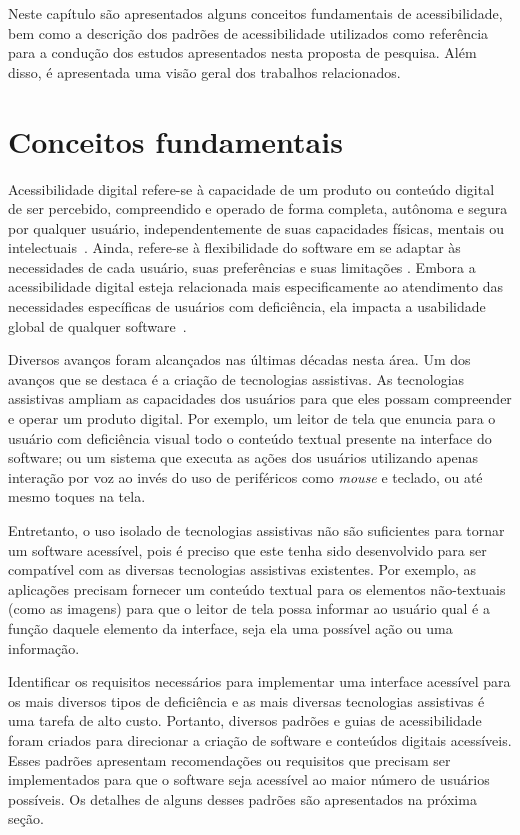 
Neste capítulo são apresentados alguns conceitos fundamentais de acessibilidade, bem como a descrição dos padrões de acessibilidade utilizados como referência para a condução dos estudos apresentados nesta proposta de pesquisa. Além disso, é apresentada uma visão geral dos trabalhos relacionados.

\section{Conceitos fundamentais}

Acessibilidade digital refere-se à capacidade de um produto ou conteúdo digital de ser percebido, compreendido e operado de forma completa, autônoma e segura por qualquer usuário, independentemente de suas capacidades físicas, mentais ou intelectuais~\cite{w3cwai}. Ainda, refere-se à flexibilidade do software em se adaptar às necessidades de cada usuário, suas preferências e suas limitações \cite{camilamaster}. 
Embora a acessibilidade digital esteja relacionada mais especificamente ao atendimento das necessidades específicas de usuários com deficiência, 
ela impacta a usabilidade global de qualquer software~\cite{ref}.

Diversos avanços foram alcançados nas últimas décadas nesta área. Um dos avanços que se destaca é a criação de tecnologias assistivas. As tecnologias assistivas ampliam as capacidades dos usuários para que eles possam compreender e operar um produto digital. Por exemplo, um leitor de tela que enuncia para o usuário com deficiência visual todo o conteúdo textual presente na interface do software; ou um sistema que executa as ações dos usuários utilizando apenas interação por voz ao invés do uso de periféricos como \textit{mouse} e teclado, ou até mesmo toques na tela. 

Entretanto, o uso isolado de tecnologias assistivas não são suficientes para tornar um software acessível, pois é preciso que este tenha sido desenvolvido para ser compatível com as diversas tecnologias assistivas existentes. Por exemplo, as aplicações precisam fornecer um conteúdo textual para os elementos não-textuais (como as imagens) para que o leitor de tela possa informar ao usuário qual é a função daquele elemento da interface, seja ela uma possível ação ou uma informação.

Identificar os requisitos necessários para implementar uma interface acessível para os mais diversos tipos de deficiência e as mais diversas tecnologias assistivas é uma tarefa de alto custo. Portanto, diversos padrões e guias de acessibilidade foram criados para direcionar a criação de software e conteúdos digitais acessíveis. Esses padrões apresentam recomendações ou requisitos que precisam ser implementados para que o software seja acessível ao maior número de usuários possíveis. Os detalhes de alguns desses padrões são apresentados na próxima seção. 

